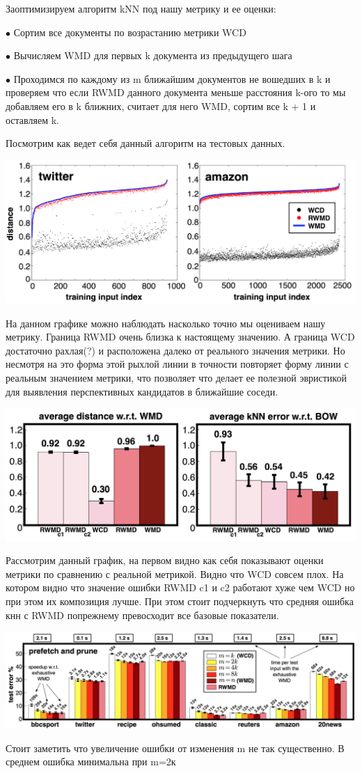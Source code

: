\documentclass[10pt,reqno]{amsart}
\theoremstyle{definition}
\theoremstyle{remark}
\begin{document}
Заоптимизируем алгоритм kNN под нашу метрику и ее оценки:

$\bullet$ Сортим все документы по возрастанию метрики WCD

$\bullet$ Вычисляем WMD для первых k документа из предыдущего шага

$\bullet$ Проходимся по каждому из m ближайшим документов не вошедших в k и проверяем что если RWMD данного документа меньше расстояния k-ого то мы добавляем его в k ближних, считает для него WMD, сортим все k + 1 и оставляем k.


Посмотрим как ведет себя данный алгоритм на тестовых данных.

\includegraphics[width=1 \textwidth]{7.png}

На данном графике можно наблюдать насколько точно мы оцениваем нашу метрику. Граница RWMD очень близка к настоящему значению. А граница WCD достаточно рахлая(?) и расположена далеко от реального значения метрики. Но несмотря на это форма этой рыхлой линии в точности повторяет форму линии с реальным значением метрики, что позволяет что делает ее полезной эвристикой для выявления перспективных кандидатов в ближайшие соседи.


\includegraphics[width=1 \textwidth]{6.png}

Рассмотрим данный график, на первом видно как себя показывают оценки метрики по сравнению с реальной метрикой. Видно что WCD совсем плох. На котором видно что значение ошибки RWMD c1 и c2 работают хуже чем WCD но при этом их композиция лучше. При этом стоит подчеркнуть что средняя ошибка кнн с RWMD попрежнему превосходит все базовые показатели.



\includegraphics[width=1 \textwidth]{8.png}

Стоит заметить что увеличение ошибки от изменения m  не так существенно. В среднем ошибка минимальна при m=2к
\end{document}
